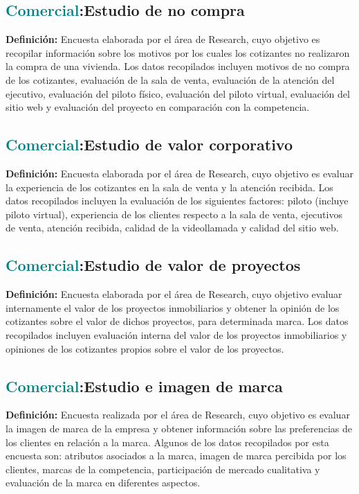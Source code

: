 \documentclass[12pt]{article}
\begin{document}
\subsection{\textcolor{teal}{Comercial}:{Estudio de no compra}}
\textbf{Definición:} Encuesta elaborada por el área de Research, cuyo objetivo es recopilar información sobre los motivos por los cuales los cotizantes no realizaron la compra de una vivienda. Los datos recopilados incluyen motivos de no compra de los cotizantes, evaluación de la sala de venta, evaluación de la atención del ejecutivo, evaluación del piloto físico, evaluación del piloto virtual, evaluación del sitio web y evaluación del proyecto en comparación con la competencia.
\subsection{\textcolor{teal}{Comercial}:{Estudio de valor corporativo}}
\textbf{Definición:} Encuesta elaborada por el área de Research, cuyo objetivo es evaluar la experiencia de los cotizantes en la sala de venta y la atención recibida. Los datos recopilados incluyen la evaluación de los siguientes factores: 
piloto (incluye piloto virtual), experiencia de los clientes respecto a la sala de venta, ejecutivos de venta, atención recibida, calidad de la videollamada y calidad del sitio web.
\subsection{\textcolor{teal}{Comercial}:{Estudio de valor de proyectos}}
\textbf{Definición:} Encuesta elaborada por el área de Research, cuyo objetivo evaluar internamente el valor de los proyectos inmobiliarios y obtener la opinión de los cotizantes sobre el valor de dichos proyectos, para determinada marca. Los datos recopilados incluyen evaluación interna del valor de los proyectos inmobiliarios y opiniones de los cotizantes propios sobre el valor de los proyectos.
\subsection{\textcolor{teal}{Comercial}:{Estudio e imagen de marca}}
\textbf{Definición:} Encuesta realizada por el área de Research, cuyo objetivo es evaluar la imagen de marca de la empresa y obtener información sobre las preferencias de los clientes en relación a la marca. Algunos de los datos recopilados por esta encuesta son: atributos asociados a la marca, imagen de marca percibida por los clientes, marcas de la competencia, participación de mercado cualitativa y evaluación de la marca en diferentes aspectos.
\end{document}
